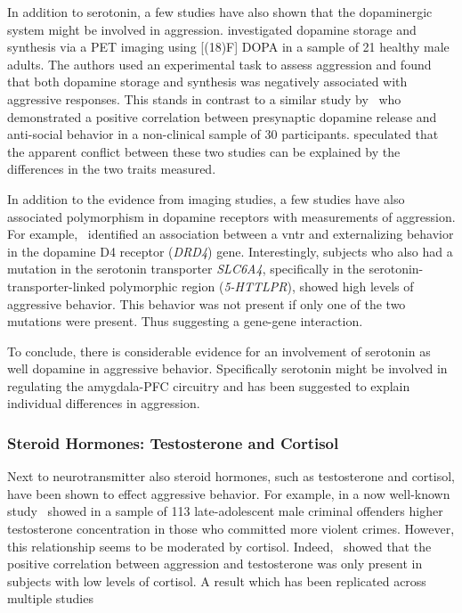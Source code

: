 In addition to serotonin, a few studies have also shown that the dopaminergic system might be involved in aggression.
\citet{Schluter2013} investigated dopamine storage and synthesis via a PET imaging using [(18)F] DOPA in a sample of 21 healthy male adults.
The authors used an experimental task to assess aggression and found that both dopamine storage and synthesis was negatively associated with aggressive responses.
This stands in contrast to a similar study by~\citet{Buckholtz2010} who demonstrated a positive correlation between presynaptic dopamine release and anti-social behavior in a non-clinical sample of 30 participants. 
\citet{Rosell2015} speculated that the apparent conflict between these two studies can be explained by the differences in the two traits measured.

In addition to the evidence from imaging studies, a few studies have also associated polymorphism in dopamine receptors with measurements of aggression.
For example,~\citet{Hohmann2009} identified an association between a \acrfull{vntr} and externalizing behavior in the dopamine D4 receptor (\textit{DRD4}) gene.
Interestingly, subjects who also had a mutation in the serotonin transporter \textit{SLC6A4}, specifically in the serotonin-transporter-linked polymorphic region (\textit{5-HTTLPR}), showed high levels of aggressive behavior.
This behavior was not present if only one of the two mutations were present.
Thus suggesting a gene-gene interaction.

To conclude, there is considerable evidence for an involvement of serotonin as well dopamine in aggressive behavior.
Specifically serotonin might be involved in regulating the amygdala-PFC circuitry and has been suggested to explain individual differences in aggression.

\subsubsection{Steroid Hormones: Testosterone and Cortisol}
\label{ssub:steriod_hormones_testosteron_and_cortisol}

Next to neurotransmitter also steroid hormones, such as testosterone and cortisol, have been shown to effect aggressive behavior.
For example, in a now well-known study~\citet{Dabbs1991} showed in a sample of 113 late-adolescent male criminal offenders higher testosterone concentration in those who committed more violent crimes.
However, this relationship seems to be moderated by cortisol.
Indeed,~\citet{Dabbs1991} showed that the positive correlation between aggression and testosterone was only present in subjects with low levels of cortisol.
A result which has been replicated across multiple studies~\cite{Popma2007,Rosell2015,Kuepper2010}

